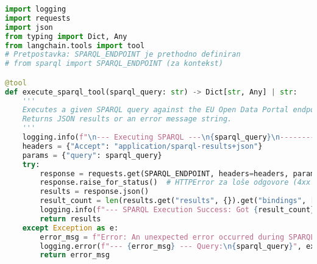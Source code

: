 \begin{itemize}
\begin{lstlisting}[language=Python, caption=Alat za izvršavanje SPARQL upita (\texttt{execute\_sparql\_tool}), label=lst:execute_sparql_tool_sparql_py, basicstyle=\footnotesize\ttfamily, breaklines=true, morekeywords={tool, logging, requests, json, Dict, Any}]
import logging
import requests
import json
from typing import Dict, Any
from langchain.tools import tool
# Pretpostavka: SPARQL_ENDPOINT je prethodno definiran
# from sparql import SPARQL_ENDPOINT (za kontekst)

@tool
def execute_sparql_tool(sparql_query: str) -> Dict[str, Any] | str:
    '''
    Executes a given SPARQL query against the EU Open Data Portal endpoint.
    Returns JSON results or an error message string.
    '''
    logging.info(f"\n--- Executing SPARQL ---\n{sparql_query}\n-----------------------")
    headers = {"Accept": "application/sparql-results+json"}
    params = {"query": sparql_query}
    try:
        response = requests.get(SPARQL_ENDPOINT, headers=headers, params=params, timeout=30)
        response.raise_for_status()  # HTTPError za loše odgovore (4xx ili 5xx)
        results = response.json()
        result_count = len(results.get("results", {}).get("bindings", []))
        logging.info(f"--- SPARQL Execution Success: Got {result_count} results ---")
        return results
    except Exception as e:
        error_msg = f"Error: An unexpected error occurred during SPARQL execution: {e}"
        logging.error(f"--- {error_msg} --- Query:\n{sparql_query}", exc_info=True)
        return error_msg
\end{lstlisting}


\end{itemize}
